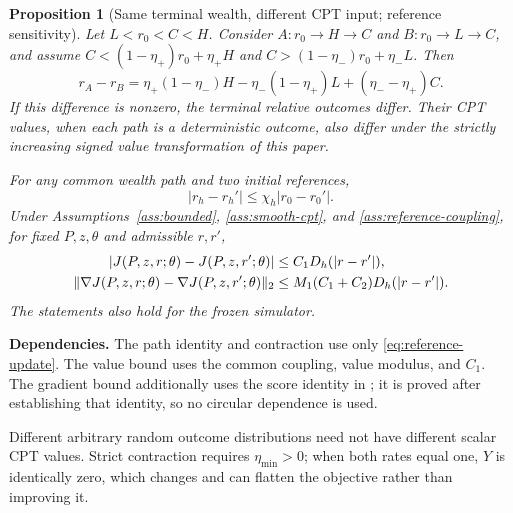 \documentclass[11pt]{article}
\newtheorem{proposition}[theorem]{Proposition}
\newcommand{\1}{\mathbf 1}
\DeclarePairedDelimiter{\norm}{\lVert}{\rVert}
\theoremstyle{definition}
\newcommand{\dependson}[1]{\par\noindent\textbf{Dependencies.} #1\par\smallskip}
\begin{document}
\begin{proposition}[Same terminal wealth, different CPT input; reference sensitivity]\label{prop:path-dependence}
Let $L<r_0<C<H$. Consider $A:r_0\to H\to C$ and $B:r_0\to L\to C$, and assume
$C<(1-\eta_+)r_0+\eta_+H$ and $C>(1-\eta_-)r_0+\eta_-L$.
Then
\begin{equation}\label{eq:path-diff}
 r_A-r_B=\eta_+(1-\eta_-)H-\eta_-(1-\eta_+)L+(\eta_--\eta_+)C.
\end{equation}
If this difference is nonzero, the terminal relative outcomes differ. Their CPT values, when each path is a deterministic outcome, also differ under the strictly increasing signed value transformation of this paper.

For any common wealth path and two initial references,
\begin{equation}\label{eq:reference-contraction}
 |r_h-r_h'|\le\chi_h|r_0-r_0'|.
\end{equation}
Under Assumptions~\ref{ass:bounded}, \ref{ass:smooth-cpt}, and \ref{ass:reference-coupling}, for fixed $P,z,\theta$ and admissible $r,r'$,
\begin{align}
 |J(P,z,r;\theta)-J(P,z,r';\theta)|
 &\le C_1D_h(|r-r'|),\label{eq:reference-value-sensitivity}\\
 \norm{\nabla J(P,z,r;\theta)-\nabla J(P,z,r';\theta)}_2
 &\le M_1(C_1+C_2)D_h(|r-r'|).\label{eq:reference-gradient-sensitivity}
\end{align}
The statements also hold for the frozen simulator.
\end{proposition}
\dependson{The path identity and contraction use only \eqref{eq:reference-update}. The value bound uses the common coupling, value modulus, and $C_1$. The gradient bound additionally uses the score identity in \Cref{thm:gradient-identity}; it is proved after establishing that identity, so no circular dependence is used.}
Different arbitrary random outcome distributions need not have different scalar CPT values. Strict contraction requires $\eta_{\min}>0$; when both rates equal one, $Y$ is identically zero, which changes and can flatten the objective rather than improving it.
\end{document}
